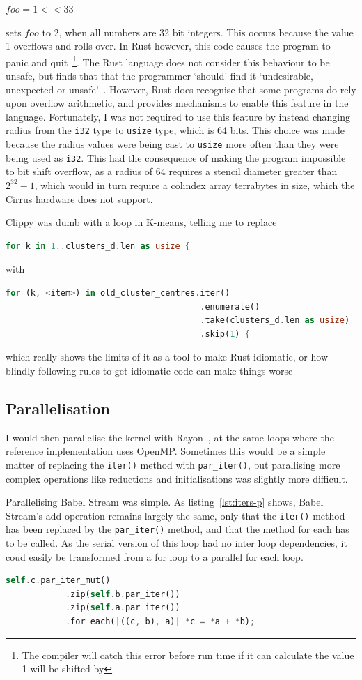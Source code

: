   $foo = 1 << 33$

sets $foo$ to 2, when all numbers are 32 bit integers. This occurs because the value 1 overflows and rolls over. In Rust however, this code causes the program to panic and quit~\footnote{The compiler will catch this error before run time if it can calculate the value 1 will be shifted by}. The Rust language does not consider this behaviour to be unsafe, but finds that that the programmer `should' find it `undesirable, unexpected or unsafe'~\cite{rustunsafe}. However, Rust does recognise that some programs do rely upon overflow arithmetic, and provides mechanisms to enable this feature in the language. Fortunately, I was not required to use this feature by instead changing radius from the \texttt{i32} type to \texttt{usize} type, which is 64 bits. This choice was made because the radius values were being cast to \texttt{usize} more often than they were being used as \texttt{i32}. This had the consequence of making the program impossible to bit shift overflow, as a radius of 64 requires a stencil diameter greater than $2^{32}-1$, which would in turn require a colindex array terrabytes in size, which the Cirrus hardware does not support.

Clippy was dumb with a loop in K-means, telling me to replace
\begin{lstlisting}[language=Rust]
for k in 1..clusters_d.len as usize {
\end{lstlisting}
with
\begin{lstlisting}[language=Rust]
 for (k, <item>) in old_cluster_centres.iter()
                                       .enumerate()
                                       .take(clusters_d.len as usize)
                                       .skip(1) {
\end{lstlisting}
which really shows the limits of it as a tool to make Rust idiomatic, or how blindly following rules to get idiomatic code can make things worse
\subsection{Parallelisation}
I would then parallelise the kernel with Rayon~\cite{RustRayon}, at the same loops where the reference implementation uses OpenMP. Sometimes this would be a simple matter of replacing the \texttt{iter()} method with \texttt{par\_iter()}, but parallising more complex operations like reductions and initialisations was slightly more difficult.

Parallelising Babel Stream was simple. As listing~\ref{lst:iters-p} shows, Babel Stream's add operation remains largely the same, only that the \texttt{iter()} method has been replaced by the \texttt{par\_iter()} method, and that the method for each has to be called. As the serial version of this loop had no inter loop dependencies, it coud easily be transformed from a for loop to a parallel for each loop.
\begin{lstlisting}[language=Rust, label=lst:iters-p, caption={Babel Stream Add, parallelised}]
self.c.par_iter_mut()
            .zip(self.b.par_iter())
            .zip(self.a.par_iter())
            .for_each(|((c, b), a)| *c = *a + *b);
\end{lstlisting}

